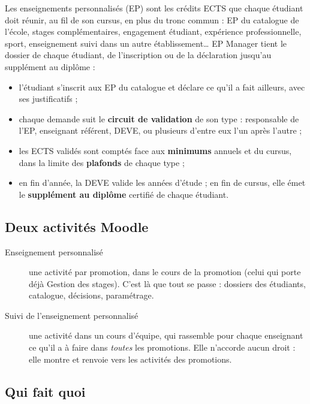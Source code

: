\documentclass[11pt,a4paper]{article}
\begin{document}
Les enseignements personnalisés (EP) sont les crédits ECTS que chaque étudiant doit réunir, au
fil de son cursus, en plus du tronc commun : EP du catalogue de l'école, stages
complémentaires, engagement étudiant, expérience professionnelle, sport, enseignement suivi
dans un autre établissement\dots{} EP Manager tient le dossier de chaque étudiant, de
l'inscription ou de la déclaration jusqu'au supplément au diplôme :
\begin{itemize}
  \item l'étudiant s'inscrit aux EP du catalogue et déclare ce qu'il a fait ailleurs, avec ses
    justificatifs ;
  \item chaque demande suit le \textbf{circuit de validation} de son type : responsable de
    l'EP, enseignant référent, DEVE, ou plusieurs d'entre eux l'un après l'autre ;
  \item les ECTS validés sont comptés face aux \textbf{minimums} annuels et du cursus, dans la
    limite des \textbf{plafonds} de chaque type ;
  \item en fin d'année, la DEVE valide les années d'étude ; en fin de cursus, elle émet le
    \textbf{supplément au diplôme} certifié de chaque étudiant.
\end{itemize}

\subsection{Deux activités Moodle}

\begin{description}
  \item[Enseignement personnalisé] une activité par promotion, dans le cours de la promotion
    (celui qui porte déjà \og Gestion des stages\fg{}). C'est là que tout se passe : dossiers
    des étudiants, catalogue, décisions, paramétrage.
  \item[Suivi de l'enseignement personnalisé] une activité dans un cours d'équipe, qui
    rassemble pour chaque enseignant ce qu'il a à faire dans \emph{toutes} les promotions. Elle
    n'accorde aucun droit : elle montre et renvoie vers les activités des promotions.
\end{description}

\subsection{Qui fait quoi}
\end{document}

